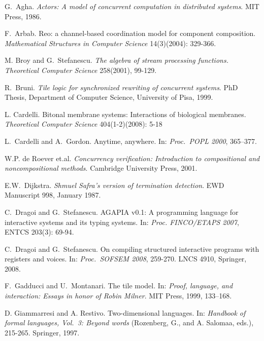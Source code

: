 \documentclass[runningheads]{llncs}
\newcommand{\1}{\u{a}}
\newcommand{\2}{\c{s}}
\newcommand{\5}{\c{t}}
\newcommand{\8}{\^{\i}}
\newcommand{\9}{\^{a}}
\def\newblock{}
\def\newblock{}
\begin{document}
\begin{thebibliography}{99}
\setlength{\itemsep}{-0.0ex plus 0.0ex}

G.~Agha.
\newblock {\it Actors: A model of concurrent computation in distributed systems}.
\newblock MIT Press, 1986.

F.~Arbab.
\newblock Reo: a channel-based coordination model for component composition. 
\newblock {\it Mathematical Structures in Computer Science} 14(3)(2004): 329-366.

M. Broy and G.~Stefanescu.
\newblock {\it The algebra of stream processing functions.}
\newblock {\it Theoretical Computer Science} 258(2001), 99-129.

R.~Bruni.
\newblock {\it Tile logic for synchronized rewriting of concurrent systems}.
\newblock PhD Thesis, Department of Computer Science, University of Pisa, 1999.

L. Cardelli. 
\newblock Bitonal membrane systems: Interactions of biological membranes. 
\newblock {\it Theoretical Computer Science} 404(1-2)(2008): 5-18

L.~Cardelli and A.~Gordon.
\newblock Anytime, anywhere.
\newblock In: {\it Proc.~POPL 2000}, 365--377.

 W.P. de Roever et.al.
\newblock {\it Concurrency verification: Introduction to compositional and noncompositional methods}.
\newblock Cambridge University Press, 2001.

E.W.~Dijkstra. 
\newblock {\it Shmuel Safra's version of termination detection}. 
\newblock EWD Manuscript 998, January 1987.

C.~Dragoi and G.~Stefanescu. 
\newblock AGAPIA v0.1: A programming language for interactive systems and its typing systems.
\newblock In: {\it Proc. FINCO/ETAPS 2007}, ENTCS 203(3): 69-94.
 
C.~Dragoi and G.~Stefanescu.
\newblock On compiling structured interactive programs with registers and voices.
\newblock In: {\it Proc.~SOFSEM 2008}, 259-270.
\newblock LNCS 4910, Springer, 2008.

F.~Gadducci and U.~Montanari.
\newblock The tile model.
\newblock In: {\it Proof, language, and interaction: Essays in honor of Robin Milner}. 
\newblock MIT Press, 1999, 133--168.

D. Giammarresi and A. Restivo.
\newblock Two-dimensional languages.
\newblock In: {\it Handbook of formal languages, Vol.~3: Beyond words}
  (Rozenberg, G., and A. Salomaa, eds.), 215-265. 
\newblock Springer, 1997.


\end{thebibliography}
\end{document}

